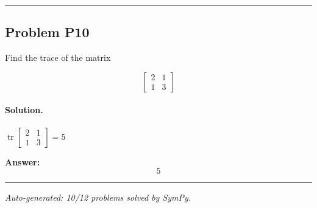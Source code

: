 \documentclass[12pt, a4paper]{article}
\newcommand{\problem}[1]{\subsection*{Problem #1}}
\newcommand{\solution}{\paragraph{Solution.}}
\begin{document}
\vspace{1em}
\hrule
\vspace{1em}

\problem{P10}

Find the trace of the matrix

$$\begin{bmatrix}2 & 1\\1 & 3\end{bmatrix}$$

\solution

$\operatorname{tr}\left[\begin{matrix}2 & 1\\1 & 3\end{matrix}\right] = 5$

\textbf{Answer:}
\[\boxed{5}\]

\vspace{1em}
\hrule
\vspace{1em}


\vspace{2em}
\noindent\textit{Auto-generated: 10/12 problems solved by SymPy.}
\end{document}
